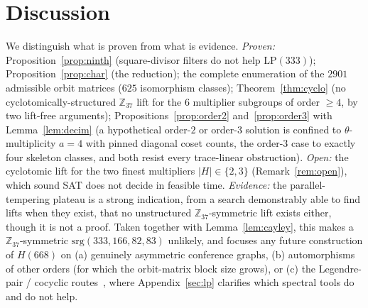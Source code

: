 \documentclass[11pt]{article}
\theoremstyle{definition}
\newcommand{\Z}{\mathbb{Z}}
\begin{document}
\section{Discussion}
We distinguish what is proven from what is evidence.
\emph{Proven:} Proposition~\ref{prop:ninth} (square-divisor filters do not help $\mathrm{LP}(333)$);
Proposition~\ref{prop:char} (the reduction); the complete enumeration of the $2901$ admissible orbit
matrices ($625$ isomorphism classes); Theorem~\ref{thm:cyclo} (no cyclotomically-structured $\Z_{37}$ lift
for the $6$ multiplier subgroups of order $\ge4$, by two lift-free arguments); Propositions~\ref{prop:order2}
and~\ref{prop:order3} with Lemma~\ref{lem:decim} (a hypothetical order-$2$ or order-$3$ solution is confined
to $\theta$-multiplicity $a=4$ with pinned diagonal coset counts, the order-$3$ case to exactly four
skeleton classes, and both resist every trace-linear obstruction). \emph{Open:} the cyclotomic lift for the
two finest multipliers $|H|\in\{2,3\}$ (Remark~\ref{rem:open}), which sound SAT does not decide in feasible
time. \emph{Evidence:} the
parallel-tempering plateau is a strong indication, from a search demonstrably able to find lifts when they
exist, that no unstructured $\Z_{37}$-symmetric lift exists either, though it is not a proof. Taken together with
Lemma~\ref{lem:cayley}, this makes a $\Z_{37}$-symmetric $\mathrm{srg}(333,166,82,83)$ unlikely, and
focuses any future construction of $H(668)$ on (a) genuinely asymmetric conference graphs, (b) automorphisms
of other orders (for which the orbit-matrix block size grows), or (c) the Legendre-pair / cocyclic
routes~\cite{adt}, where Appendix~\ref{sec:lp} clarifies which spectral tools do and do not help.
\end{document}
